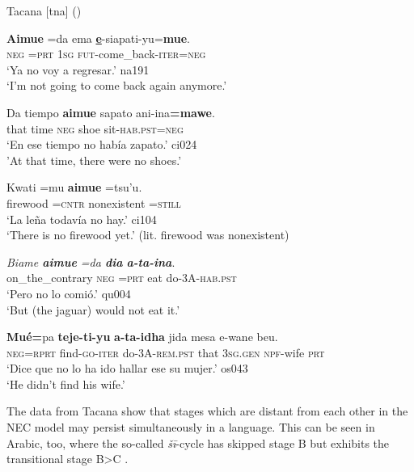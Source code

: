 \documentclass[output=paper,chinesefont,colorlinks,citecolor=brown]{langscibook}
\begin{document}
\begin{exe}
\ex Tacana [tna] () \label{ex:tacana1}
\begin{xlist}
\ex \label{ex:tacana1a}
\gll  \textbf{Aimue} =da ema \textbf{\uline{e}}-siapati-yu=\textbf{mue}.\\
\textsc{neg} \textsc{=prt} \textsc{1sg} \textsc{fut}-come\_back-\textsc{iter=neg}\\
\glt `Ya no voy a regresar.' na191\\ 
`I'm not going to come back again anymore.'

\ex \label{ex:tacana1b}
\gll {\ob}Da tiempo{\cb} \textbf{aimue} sapato ani-ina\textbf{=mawe}.\\
that time \textsc{neg} shoe sit-\textsc{hab.pst=neg}\\
\glt `En ese tiempo no había zapato.' ci024\\
'At that time, there were no shoes.'

\ex \label{ex:tacana1c}
\gll Kwati =mu \textbf{aimue} =tsu'u.\\
firewood =\textsc{cntr} nonexistent =\textsc{still}\\
\glt `La leña todavía no hay.' ci104\\
`There is no firewood yet.' (lit. firewood was nonexistent)

\ex \label{ex:tacana1d}
\textit{Biame \textbf{aimue} =da \textbf{dia} \textbf{a-ta-ina}}.\\
on\_the\_contrary \textsc{neg} \textsc{=prt} eat do\textsc{-3A-hab.pst}\\
\glt `Pero no lo comió.' qu004\\
`But (the jaguar) would not eat it.'

\ex \label{ex:tacana1e}
\gll \textbf{Mué=}pa \textbf{teje-ti-yu} \textbf{a-ta-idha} {\ob}jida mesa e-wane{\cb} beu.\\
\textsc{neg=rprt} find-\textsc{go-iter} do\textsc{-3A-rem.pst} that \textsc{3sg.gen} \textsc{npf}-wife \textsc{prt}\\
\glt `Dice que no lo ha ido hallar ese su mujer.' os043\\
`He didn't find his wife.'

\end{xlist}
\end{exe}
The data from Tacana show that stages which are distant from each other in the NEC model may persist simultaneously in a language. This can be seen in Arabic, too, where the so-called \textit{šī}-cycle has skipped stage B but exhibits the transitional stage B>C .
\end{document}

